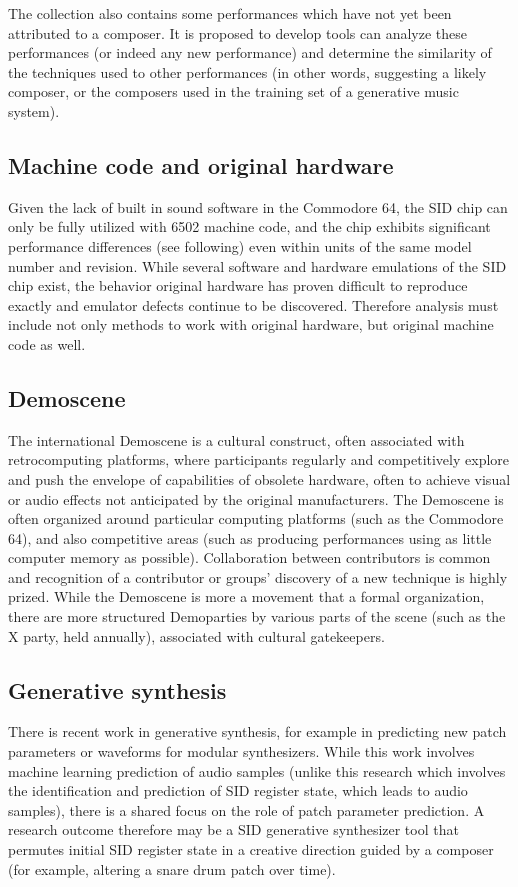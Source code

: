 \documentclass[10pt]{article}
\begin{document}
\begin{multicols*}{2}
  The collection also contains some performances which have not
  yet been attributed to a composer. It is proposed to develop tools
  can analyze these performances (or indeed any new performance) and
  determine the similarity of the techniques used to other
  performances (in other words, suggesting a likely composer, or the
  composers used in the training set of a generative music system).

  \subsection{Machine code and original hardware}
  Given the lack of built in sound software in the Commodore 64, the
  SID chip can only be fully utilized with 6502 machine code, and the
  chip exhibits significant performance differences (see following)
  even within units of the same model number and revision.  While
  several software and hardware emulations of the SID chip exist, the
  behavior original hardware has proven difficult to reproduce exactly
  and emulator defects continue to be discovered.  Therefore analysis
  must include not only methods to work with original hardware, but
  original machine code as well.

  \subsection{Demoscene}
  The international Demoscene is a cultural construct, often associated
  with retrocomputing platforms, where participants regularly and
  competitively explore and push the envelope of capabilities of obsolete
  hardware, often to achieve visual or audio effects not anticipated
  by the original manufacturers. The Demoscene is often organized around
  particular computing platforms (such as the Commodore 64), and also
  competitive areas (such as producing performances using as little
  computer memory as possible). Collaboration between contributors is
  common and recognition of a contributor or groups' discovery of a new
  technique is highly prized. While the Demoscene is more a movement
  that a formal organization, there are more structured Demoparties by
  various parts of the scene (such as the X party, held annually),
  associated with cultural gatekeepers.

  \subsection{Generative synthesis}
  There is recent work in generative synthesis, for example in
  predicting new patch parameters or waveforms for modular
  synthesizers.  While this work involves machine learning prediction
  of audio samples (unlike this research which involves the
  identification and prediction of SID register state, which leads to
  audio samples), there is a shared focus on the role of patch
  parameter prediction.  A research outcome therefore may be
  a SID generative synthesizer tool that permutes initial
  SID register state in a creative direction guided by a composer
  (for example, altering a snare drum patch over time).


\end{multicols*}
\end{document}
